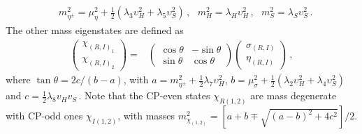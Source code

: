 \documentclass[12pt]{article}
\begin{document}
\begin{align*}
   & m_{\eta^{\pm}}^{2}= \mu_{\eta}^{2} + \frac{1}{2} (\lambda_{3} \upsilon^{2}_{H} + \lambda_{5} \upsilon^{2}_{S} )\,,\,\,\,\, m_{H}^{2} = \lambda_{H} \upsilon_{H}^{2}\,,\,\,\,\,    m_{S}^{2}= \lambda_{S} \upsilon_{S}^{2}\,.
\end{align*}
%
The other mass eigenstates are defined as
%
\begin{align*}
    \begin{pmatrix}\chi_{(R,I)_{1}} \\ \chi_{(R,I)_{2}} \end{pmatrix} =& \begin{pmatrix} \cos\theta & -\sin\theta \\ \sin\theta & \cos\theta \end{pmatrix} \begin{pmatrix}\sigma_{(R,I)} \\ \eta_{(R,I)} \end{pmatrix} \,,
\end{align*}
%
where $\tan\theta= 2c/(b-a)$, with $a = m^{2}_{\eta^{\pm}} + \frac{1}{2}\lambda_{7} \upsilon^{2}_{H}$, $b = \mu^{2}_{\sigma}+\frac{1}{2}(\lambda_{2} \upsilon^{2}_{H} + \lambda_{4} \upsilon^{2}_{S})$ and $c = \frac{1}{2}\lambda_8 v_{H} v_{S}$\,. Note that the CP-even  states $\chi_{R(1,2)}$ are mass degenerate with CP-odd ones $\chi_{I(1,2)}$, with masses $ m_{\chi_{(1,2)}}^{2}= [a + b \mp \sqrt{(a-b)^{2} + 4c^{2}}]/2$.   

%
%
\end{document}
